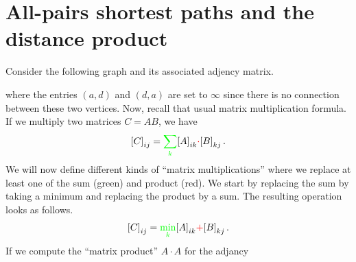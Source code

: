 \section{All-pairs shortest paths and the distance product}
Consider the following graph and its associated adjency matrix.
\begin{figure}[h!]
  \centering
\end{figure}
where the entries $(a,d)$ and $(d,a)$ are set to $\infty$ since there
is no connection between these two vertices. Now, recall that usual
matrix multiplication formula. If we multiply two matrices $C = AB$,
we have
\begin{equation*}
  {[C]}_{ij} = {\color{green}\sum_k} {[A]}_{ik} {\color{red}\cdot} {[B]}_{kj}\,.
\end{equation*}
We will now define different kinds of ``matrix multiplications'' where
we replace at least one of the sum (green) and product (red). We start
by replacing the sum by taking a minimum and replacing the product by
a sum. The resulting operation looks as follows.
\begin{equation*}
  {[C]}_{ij} = {\color{green}\min_k} {[A]}_{ik} {\color{red}+} {[B]}_{kj}\,.
\end{equation*}
If we compute the ``matrix product'' $A \cdot A$ for the adjancy
